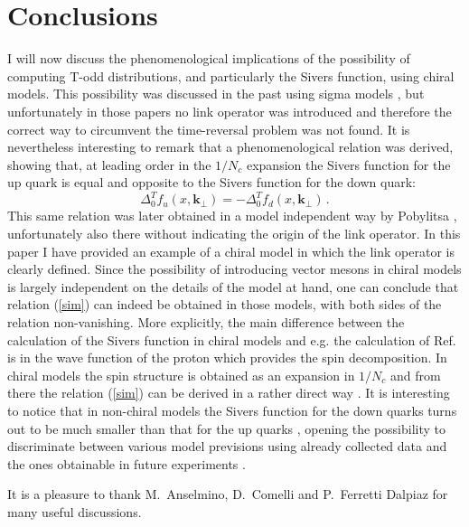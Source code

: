 \documentclass[]{revtex4}
\def\be{\begin{equation}}
\def\ee{\end{equation}}
\begin{document}
\section{Conclusions}
I will now discuss the phenomenological implications of the 
possibility of computing T-odd distributions, and particularly the
Sivers function, using chiral models. This possibility was discussed
in the past using sigma models
\cite{Anselmino:1996qm,Anselmino:1997jj,Anselmino:2001vn,Anselmino:2002yx},
but unfortunately in those papers no link operator was introduced and
therefore the correct way to circumvent 
the time-reversal problem was not found. 
It is nevertheless interesting to remark
that a phenomenological relation was derived, showing that,
at leading order in the $1/N_c$ expansion the Sivers function for
the up quark is equal and opposite to the Sivers function for the
down quark:
\be
\Delta_0^T f_u(x,\mathbf k_\perp)=
-\Delta_0^T f_d(x,\mathbf k_\perp)\, . \label{sim}
\ee
This same relation was later obtained in a 
model independent way by Pobylitsa \cite{Pobylitsa:2003ty},
unfortunately also there without indicating the origin of 
the link operator. In this paper I have provided an
example of a chiral model in which the link operator is clearly defined.
Since the possibility of introducing vector mesons in chiral models
is largely independent on the details of the model at hand, one can
conclude that relation (\ref{sim}) can indeed be obtained in
those models, with both sides of the relation non-vanishing.
More explicitly, the main difference between the calculation
of the Sivers function in chiral models and e.g. the calculation
of Ref.~\cite{Brodsky:2002cx} is in the wave function of the proton
which provides the spin decomposition. In chiral models the spin
structure is obtained as an expansion in $1/N_c$ and from there
the relation (\ref{sim}) can be derived in a rather direct way 
\cite{Pobylitsa:2003ty}.
It is interesting to notice that in non-chiral models the 
Sivers function for the down quarks turns out to be much smaller than that
for the up quarks \cite{Bacchetta:2003rz,Lu:2004au}, 
opening the possibility to discriminate
between various model previsions using already collected data
and the ones obtainable in future experiments 
\cite{Airapetian:2004tw,Webb:2005cd,Pagano:2005jx,PAX,Anselmino:2005nn}.

\bigskip
It is a pleasure to thank M.~Anselmino, D.~Comelli and 
P.~Ferretti Dalpiaz for many
useful discussions.






\end{document}
